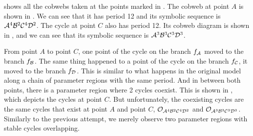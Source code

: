  shows all the cobwebs taken at the points marked in .
The cobweb at point $A$ is shown in .
We can see that it has period 12 and its symbolic sequence is $\mathcal{A}^4\mathcal{B}^2\mathcal{C}^4\mathcal{D}^2$.
The cycle at point $C$ also has period 12.
Its cobweb diagram is shown in , and we can see that its symbolic sequence is $\mathcal{A}^3\mathcal{B}^3\mathcal{C}^3\mathcal{D}^3$.

From point $A$ to point $C$, one point of the cycle on the branch $f_{\mathcal{A}}$ moved to the branch $f_{\mathcal{B}}$.
The same thing happened to a point of the cycle on the branch $f_{\mathcal{C}}$, it moved to the branch $f_{\mathcal{D}}$.
This is similar to what happens in the original model along a chain of parameter regions with the same period.
And in between both points, there is a parameter region where 2 cycles coexist.
This is shown in , which depicts the cycles at point $C$.
But unfortunately, the coexisting cycles are the same cycles that exist at point $A$ and point $C$, $\mathcal{O}_{\mathcal{A}^4\mathcal{B}^2\mathcal{C}^4\mathcal{D}^2}$ and $\mathcal{O}_{\mathcal{A}^3\mathcal{B}^3\mathcal{C}^3\mathcal{D}^3}$.
Similarly to the previous attempt, we merely observe two parameter regions with stable cycles overlapping.
